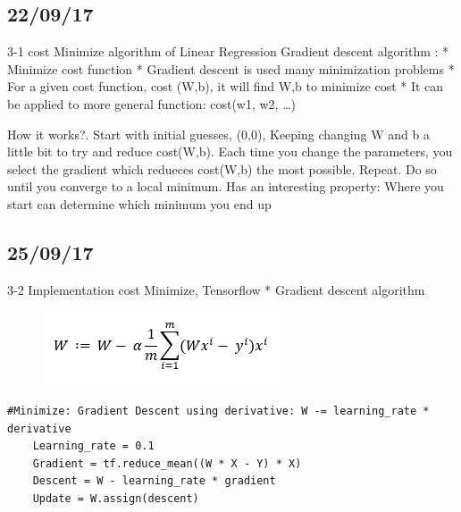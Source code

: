\documentclass{article}
\begin{document}
\begin{CJK}{UTF8}{}
\subsection{22/09/17}
3-1 cost Minimize algorithm of Linear Regression\newline
Gradient descent algorithm : \newline
*	Minimize cost function\newline
*	Gradient descent is used many minimization problems\newline
*	For a given cost function, cost (W,b), it will find W,b to minimize cost\newline
*	It can be applied to more general function: cost(w1, w2, …)\newline

How it works?.	Start with initial guesses, (0,0), Keeping changing W and b a little bit to try and reduce cost(W,b).	Each time you change the parameters, you select the gradient which redueces cost(W,b) the most possible.	Repeat.	Do so until you converge to a local minimum.	Has an interesting property: Where you start can determine which minimum you end up\newline

\subsection{25/09/17}
3-2 Implementation cost Minimize, Tensorflow\newline
*	Gradient descent algorithm\newline
\begin{figure}[h!]
\centering
\includegraphics[scale=0.6]{2.jpg}
\end{figure}
\begin{verbatim}
#Minimize: Gradient Descent using derivative: W -= learning_rate * derivative
	Learning_rate = 0.1
	Gradient = tf.reduce_mean((W * X - Y) * X)
	Descent = W - learning_rate * gradient
	Update = W.assign(descent)
\end{verbatim}\newline


\end{CJK}
\end{document}
